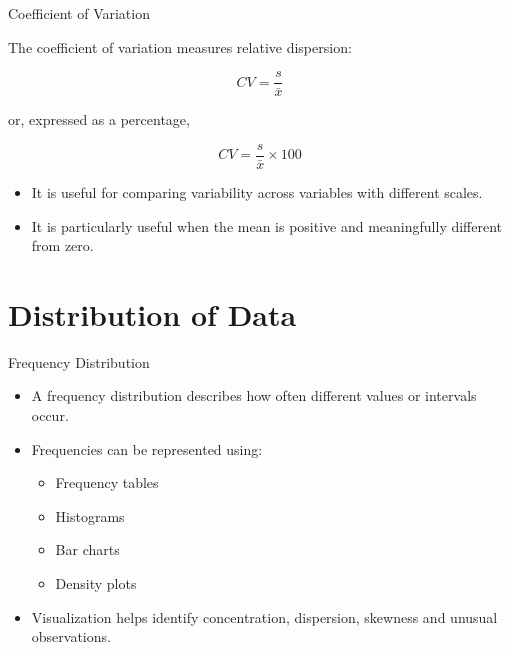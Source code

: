 \documentclass{beamer}
\begin{document}
\begin{frame}{Coefficient of Variation}

The coefficient of variation measures relative dispersion:

\vskip 0.5cm

\[
CV =
\frac{s}{\bar{x}}
\]

\vskip 0.2cm

or, expressed as a percentage,

\[
CV =
\frac{s}{\bar{x}}\times100
\]

\vskip 0.5cm

\begin{itemize}

  \item It is useful for comparing variability across variables with different scales.

  \item It is particularly useful when the mean is positive and meaningfully different from zero.

\end{itemize}

\end{frame}



\section{Distribution of Data}

\begin{frame}{Frequency Distribution}

\begin{itemize}

  \item A frequency distribution describes how often different values or intervals occur.

  \vskip 0.4cm

  \item Frequencies can be represented using:

  \begin{itemize}
    \item Frequency tables
    \item Histograms
    \item Bar charts
    \item Density plots
  \end{itemize}

  \vskip 0.4cm

  \item Visualization helps identify concentration, dispersion, skewness and unusual observations.

\end{itemize}

\end{frame}
\end{document}
